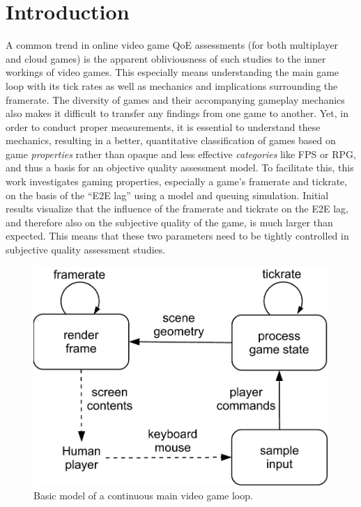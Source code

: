 \section{Introduction}
\label{sec:introduction}

A common trend in online video game \gls{QoE} assessments (for both multiplayer and cloud games) is the apparent obliviousness of such studies to the inner workings of video games. This especially means understanding the main game loop with its tick rates as well as mechanics and implications surrounding the framerate. The diversity of games and their accompanying gameplay mechanics also makes it difficult to transfer any findings from one game to another. Yet, in order to conduct proper measurements, it is essential to understand these mechanics, resulting in a better, quantitative classification of games based on game \textit{properties} rather than opaque and less effective \textit{categories} like \gls{FPS} or \gls{RPG}, and thus a basis for an objective quality assessment model. To facilitate this, this work investigates gaming properties, especially a game's framerate and tickrate, on the basis of the ``\gls{E2E} lag'' using a model and queuing simulation. Initial results visualize that the influence of the framerate and tickrate on the \gls{E2E} lag, and therefore also on the subjective quality of the game, is much larger than expected. This means that these two parameters need to be tightly controlled in subjective quality assessment studies.


\begin{figure}[!t]
	\centering
	\includegraphics[width=0.8\columnwidth]{../../../models/game_loop.pdf}
	\caption{Basic model of a continuous main video game loop.}
	\label{fig:gameloop1}
\end{figure}

